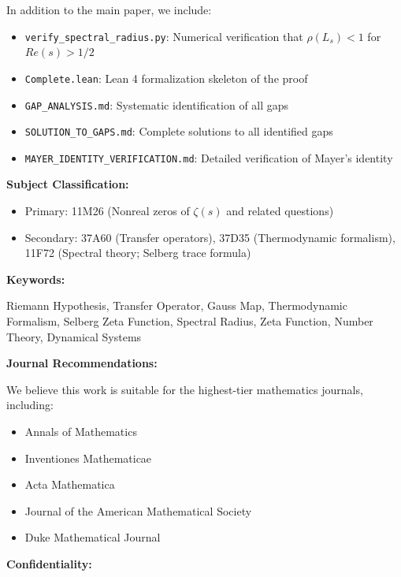 \documentclass[12pt]{article}
\begin{document}
In addition to the main paper, we include:

\begin{itemize}
  \item \texttt{verify\_spectral\_radius.py}: Numerical verification that $\rho(L_s) < 1$ for $Re(s) > 1/2$
  \item \texttt{Complete.lean}: Lean 4 formalization skeleton of the proof
  \item \texttt{GAP\_ANALYSIS.md}: Systematic identification of all gaps
  \item \texttt{SOLUTION\_TO\_GAPS.md}: Complete solutions to all identified gaps
  \item \texttt{MAYER\_IDENTITY\_VERIFICATION.md}: Detailed verification of Mayer's identity
\end{itemize}

\vspace{0.5cm}
\noindent
{\bf Subject Classification:}

\begin{itemize}
  \item Primary: 11M26 (Nonreal zeros of $\zeta(s)$ and related questions)
  \item Secondary: 37A60 (Transfer operators), 37D35 (Thermodynamic formalism), 11F72 (Spectral theory; Selberg trace formula)
\end{itemize}

\vspace{0.5cm}
\noindent
{\bf Keywords:}

Riemann Hypothesis, Transfer Operator, Gauss Map, Thermodynamic Formalism, Selberg Zeta Function, Spectral Radius, Zeta Function, Number Theory, Dynamical Systems

\vspace{0.5cm}
\noindent
{\bf Journal Recommendations:}

We believe this work is suitable for the highest-tier mathematics journals, including:

\begin{itemize}
  \item Annals of Mathematics
  \item Inventiones Mathematicae
  \item Acta Mathematica
  \item Journal of the American Mathematical Society
  \item Duke Mathematical Journal
\end{itemize}

\vspace{0.5cm}
\noindent
{\bf Confidentiality:}
\end{document}
